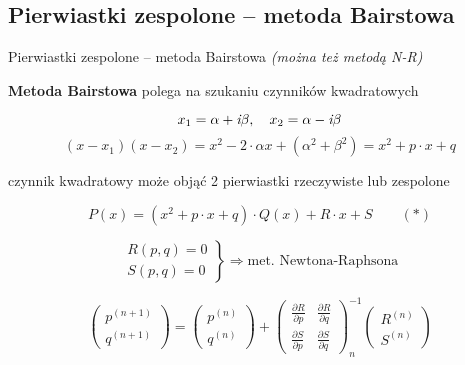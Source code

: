 \subsection{Pierwiastki zespolone -- metoda Bairstowa}

\begin{frame}{Pierwiastki zespolone -- metoda Bairstowa}
  \textit{(można też metodą N-R)}

  \vspace{5px}

  \textbf{Metoda Bairstowa} polega na szukaniu czynników kwadratowych

  $$x_1 = \alpha + \textit{\textrm{i}}\beta, \quad x_2 = \alpha - \textit{\textrm{i}}\beta$$
  $$(x - x_1)(x - x_2) = x^2 - 2 \cdot \alpha x + (\alpha^2 + \beta^2) = x^2 + p \cdot x + q$$

  czynnik kwadratowy może objąć 2 pierwiastki rzeczywiste lub zespolone

  $$P(x) = (x^2 + p \cdot x + q) \cdot Q(x) + R \cdot x + S \qquad (*)$$
\end{frame}

\begin{frame}
  $$\left. \begin{array}{l}
  R(p,q)=0 \\ S(p,q)=0
  \end{array}\right\} \Rightarrow \text{met. Newtona-Raphsona}$$

  $$\left( \begin{array}{l}
  p^{(n+1)} \\ q^{(n+1)}
  \end{array} \right)
  =
  \left( \begin{array}{l}
  p^{(n)} \\ q^{(n)}
  \end{array} \right)
  +
  \left( \begin{array}{ll}
  \frac{{\partial}R}{{\partial}p} & \frac{{\partial}R}{{\partial}q} \\
  \frac{{\partial}S}{{\partial}p} & \frac{{\partial}S}{{\partial}q}
  \end{array} \right)_n^{-1}
  \left( \begin{array}{l}
  R^{(n)} \\ S^{(n)}
  \end{array} \right)$$
\end{frame}

